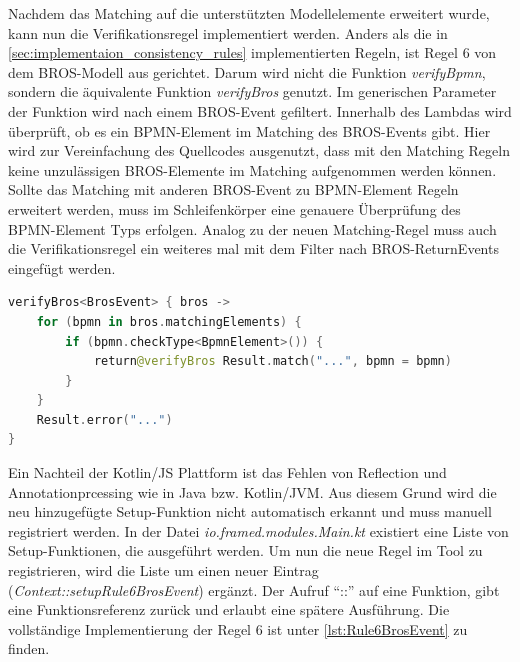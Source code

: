 Nachdem das Matching auf die unterstützten Modellelemente erweitert wurde, kann nun die Verifikationsregel implementiert werden.
Anders als die in \cref{sec:implementaion_consistency_rules} implementierten Regeln, ist Regel 6 von dem BROS-Modell aus gerichtet.
Darum wird nicht die Funktion \emph{verifyBpmn}, sondern die äquivalente Funktion \emph{verifyBros} genutzt.
Im generischen Parameter der Funktion wird nach einem BROS-Event gefiltert.
Innerhalb des Lambdas wird überprüft, ob es ein BPMN-Element im Matching des BROS-Events gibt.
Hier wird zur Vereinfachung des Quellcodes ausgenutzt, dass mit den Matching Regeln keine unzulässigen BROS-Elemente im Matching aufgenommen werden können.
Sollte das Matching mit anderen BROS-Event zu BPMN-Element Regeln erweitert werden, muss im Schleifenkörper eine genauere Überprüfung des BPMN-Element Typs erfolgen.
Analog zu der neuen Matching-Regel muss auch die Verifikationsregel ein weiteres mal mit dem Filter nach BROS-ReturnEvents eingefügt werden.

\begin{lstlisting}[language=Kotlin, caption=Implementierung von Regel 6, label=lst:implementation_rule_6]
verifyBros<BrosEvent> { bros ->
    for (bpmn in bros.matchingElements) {
        if (bpmn.checkType<BpmnElement>()) {
            return@verifyBros Result.match("...", bpmn = bpmn)
        }
    }
    Result.error("...")
}
\end{lstlisting}

Ein Nachteil der Kotlin/JS Plattform ist das Fehlen von Reflection und Annotationprcessing wie in Java bzw. Kotlin/JVM.
Aus diesem Grund wird die neu hinzugefügte Setup-Funktion nicht automatisch erkannt und muss manuell registriert werden.
In der Datei \emph{io.framed.modules.Main.kt} existiert eine Liste von Setup-Funktionen, die ausgeführt werden.
Um nun die neue Regel im Tool zu registrieren, wird die Liste um einen neuer Eintrag (\emph{Context::setupRule6BrosEvent}) ergänzt.
Der Aufruf ``::'' auf eine Funktion, gibt eine Funktionsreferenz zurück und erlaubt eine spätere Ausführung.
Die vollständige Implementierung der Regel 6 ist unter \cref{lst:Rule6BrosEvent} zu finden.
